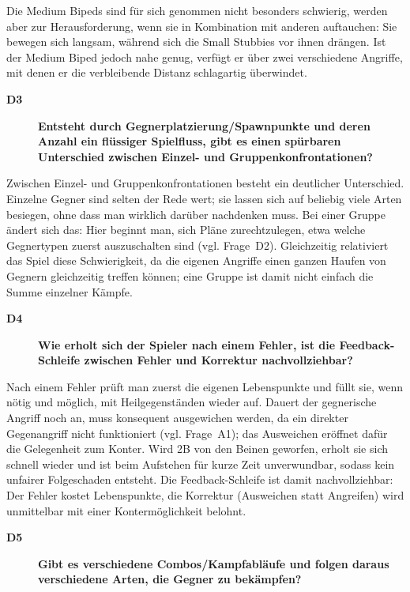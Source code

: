 \documentclass[../Main.tex]{subfiles}
\begin{document}
Die Medium Bipeds sind für sich genommen nicht besonders schwierig, werden aber zur Herausforderung, wenn sie in Kombination mit anderen auftauchen: Sie bewegen sich langsam, während sich die Small Stubbies vor ihnen drängen. Ist der Medium Biped jedoch nahe genug, verfügt er über zwei verschiedene Angriffe, mit denen er die verbleibende Distanz schlagartig überwindet.

\begin{description}
  \item[\textbf{D3}] \textbf{Entsteht durch Gegnerplatzierung/Spawnpunkte und deren Anzahl ein flüssiger Spielfluss, gibt es einen spürbaren Unterschied zwischen Einzel- und Gruppenkonfrontationen?}
\end{description}

Zwischen Einzel- und Gruppenkonfrontationen besteht ein deutlicher Unterschied. Einzelne Gegner sind selten der Rede wert; sie lassen sich auf beliebig viele Arten besiegen, ohne dass man wirklich darüber nachdenken muss. Bei einer Gruppe ändert sich das: Hier beginnt man, sich Pläne zurechtzulegen, etwa welche Gegnertypen zuerst auszuschalten sind (vgl. Frage~D2). Gleichzeitig relativiert das Spiel diese Schwierigkeit, da die eigenen Angriffe einen ganzen Haufen von Gegnern gleichzeitig treffen können; eine Gruppe ist damit nicht einfach die Summe einzelner Kämpfe.

\begin{description}
  \item[\textbf{D4}] \textbf{Wie erholt sich der Spieler nach einem Fehler, ist die Feedback-Schleife zwischen Fehler und Korrektur nachvollziehbar?}
\end{description}

Nach einem Fehler prüft man zuerst die eigenen Lebenspunkte und füllt sie, wenn nötig und möglich, mit Heilgegenständen wieder auf. Dauert der gegnerische Angriff noch an, muss konsequent ausgewichen werden, da ein direkter Gegenangriff nicht funktioniert (vgl. Frage~A1); das Ausweichen eröffnet dafür die Gelegenheit zum Konter. Wird 2B von den Beinen geworfen, erholt sie sich schnell wieder und ist beim Aufstehen für kurze Zeit unverwundbar, sodass kein unfairer Folgeschaden entsteht. Die Feedback-Schleife ist damit nachvollziehbar: Der Fehler kostet Lebenspunkte, die Korrektur (Ausweichen statt Angreifen) wird unmittelbar mit einer Kontermöglichkeit belohnt.

\begin{description}
  \item[\textbf{D5}] \textbf{Gibt es verschiedene Combos/Kampfabläufe und folgen daraus verschiedene Arten, die Gegner zu bekämpfen?}
\end{description}
\end{document}

